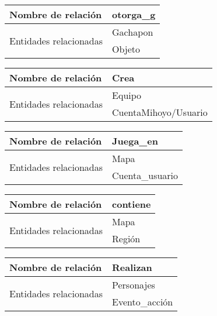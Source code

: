 \documentclass{report}
\begin{document}
\begin{center}    
    \begin{tabular}{|p{3cm}|p{5cm}|}
    \hline
    Nombre de relación& otorga\_g\\ 
    \hline
    \hline
    \multirow{2}{6em}{Entidades relacionadas}& Gachapon \\ &Objeto\\ 
    \hline
    \end{tabular}
\end{center}

\begin{center}    
    \begin{tabular}{|p{3cm}|p{5cm}|}
    \hline
    Nombre de relación& Crea\\ 
    \hline
    \hline
    \multirow{2}{6em}{Entidades relacionadas}&Equipo \\ &CuentaMihoyo/Usuario\\ 
    \hline
    \end{tabular}
\end{center}

\begin{center}    
    \begin{tabular}{|p{3cm}|p{5cm}|}
    \hline
    Nombre de relación& Juega\_en\\ 
    \hline
    \hline
    \multirow{2}{6em}{Entidades relacionadas}& Mapa \\ &Cuenta\_usuario\\ 
    \hline
    \end{tabular}
\end{center}

\begin{center}    
    \begin{tabular}{|p{3cm}|p{5cm}|}
    \hline
    Nombre de relación& contiene\\ 
    \hline
    \hline
    \multirow{2}{6em}{Entidades relacionadas}& Mapa \\ &Región\\ 
    \hline
    \end{tabular}
\end{center}

\begin{center}    
    \begin{tabular}{|p{3cm}|p{5cm}|}
    \hline
    Nombre de relación& Realizan\\ 
    \hline
    \hline
    \multirow{2}{6em}{Entidades relacionadas}& Personajes \\ &Evento\_acción\\ 
    \hline
    \end{tabular}
\end{center}
\end{document}
